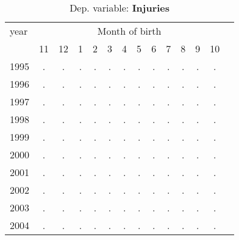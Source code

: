  \begin{table}[H] \begin{threeparttable} \centering \caption{Dep. variable: \textbf{Injuries}} {\def\sym#1{\ifmmode^{#1}\else\(^{#1}\)\fi} \begin{tabular}{l*{13}{c}} \toprule year & \multicolumn{12}{c}{Month of birth} \\ \cmidrule(lr){2-13} 
            &          11&          12&           1&           2&           3&           4&           5&           6&           7&           8&           9&          10\\
1995        &           .&           .&           .&           .&           .&           .&           .&           .&           .&           .&           .&           .\\
1996        &           .&           .&           .&           .&           .&           .&           .&           .&           .&           .&           .&           .\\
1997        &           .&           .&           .&           .&           .&           .&           .&           .&           .&           .&           .&           .\\
1998        &           .&           .&           .&           .&           .&           .&           .&           .&           .&           .&           .&           .\\
1999        &           .&           .&           .&           .&           .&           .&           .&           .&           .&           .&           .&           .\\
2000        &           .&           .&           .&           .&           .&           .&           .&           .&           .&           .&           .&           .\\
2001        &           .&           .&           .&           .&           .&           .&           .&           .&           .&           .&           .&           .\\
2002        &           .&           .&           .&           .&           .&           .&           .&           .&           .&           .&           .&           .\\
2003        &           .&           .&           .&           .&           .&           .&           .&           .&           .&           .&           .&           .\\
2004        &           .&           .&           .&           .&           .&           .&           .&           .&           .&           .&           .&           .\\

\end{tabular}}
\end{threeparttable}
\end{table}
